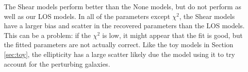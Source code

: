 The Shear models perform better than the None models, but do not perform as well as our LOS models. In all of the parameters except $\chi^2$, the Shear models have a larger bias and scatter in the recovered parameters than the LOS models. This can be a problem: if the $\chi^2$ is low, it might appear that the fit is good, but the fitted parameters are not actually correct. Like the toy models in Section \ref{sec:toy}, the ellipticity has a large scatter likely due the model using it to try account for the perturbing galaxies.